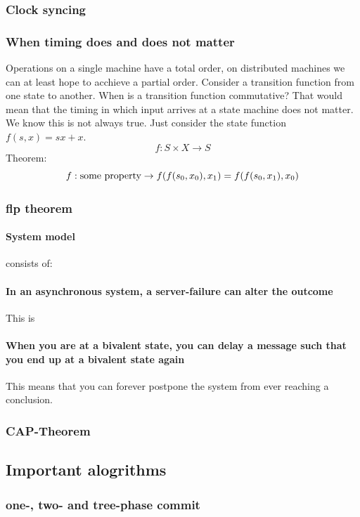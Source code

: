 \subsubsection{Clock syncing}


\subsubsection{When timing does and does not matter}
Operations on a single machine have a total order, on distributed machines we can at least hope to acchieve a partial order.
Consider a transition function from one state to another. When is a transition function commutative? That would mean that the timing in which input arrives at a state machine does not matter. We know this is not always true. Just consider the state function $f(s, x) = sx + x$. 
$$ f : S \times X \to S$$
Theorem:
$$ f: \text{some property} \to f(f(s_0, x_0), x_1) = f(f(s_0, x_1), x_0)$$

\subsubsection{flp theorem}

\paragraph{System model} consists of:
\paragraph{In an asynchronous system, a server-failure can alter the outcome} This is
\paragraph{When you are at a bivalent state, you can delay a message such that you end up at a bivalent state again} This means that you can forever postpone the system from ever reaching a conclusion. 

\subsubsection{CAP-Theorem}


\subsection{Important alogrithms}

\subsubsection{one-, two- and tree-phase commit}

